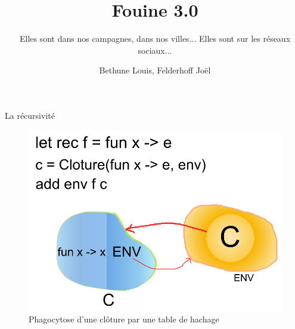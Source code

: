 \documentclass[pdf]{beamer}
\title{Fouine 3.0}
\subtitle{Elles sont dans nos campagnes, dans nos villes... Elles sont sur les réseaux sociaux... }
\author{Bethune Louis, Felderhoff Joël}
\begin{document}
\begin{frame}
\titlepage
\end{frame}

\begin{frame}{La récursivité}
\begin{figure}
\center
\includegraphics[scale=0.3]{Drawing.png} 
\caption {Phagocytose d'une clôture par une table de hachage}
\end{figure}
\end{frame}
\end{document}
